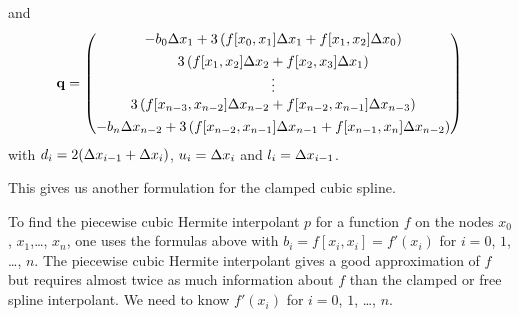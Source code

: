 and
\[
\mathbf{q} = \begin{pmatrix}
- b_0 \Delta{x_1} + 3 \left( f[x_0,x_1]\Delta{x_1} + f[x_1,x_2]
\Delta{x_0} \right) \\[0.4em]
3 \left( f[x_1,x_2]\Delta{x_2} + f[x_2,x_3] \Delta{x_1} \right) \\
\vdots \\
3 \left( f[x_{n-3},x_{n-2}]\Delta{x_{n-2}}
+ f[x_{n-2},x_{n-1}] \Delta{x_{n-3}} \right) \\[0.4em]
- b_n \Delta{x_{n-2}} + 3 \left( f[x_{n-2},x_{n-1}]\Delta{x_{n-1}}
+ f[x_{n-1},x_n] \Delta{x_{n-2}} \right)
\end{pmatrix}
\]
with $d_i = 2(\Delta{x_{i-1}} + \Delta{x_i})$, $u_i = \Delta{x_i}$ and
$l_i = \Delta{x_{i-1}}$.

This gives us another formulation for the clamped cubic spline.

\begin{rmk}
To find the piecewise cubic Hermite interpolant $p$ for a function $f$
on the nodes $x_0$, $x_1$,\ldots, $x_n$, one uses the formulas above
with $b_i = f[x_i,x_i] = f'(x_i)$ for $i=0$, $1$, \ldots, $n$.  The
piecewise cubic Hermite interpolant gives a good approximation of $f$
but requires almost twice as much information about $f$ than the
clamped or free spline interpolant. We need to know $f'(x_i)$ for
$i=0$, $1$, \ldots, $n$.
\end{rmk}

